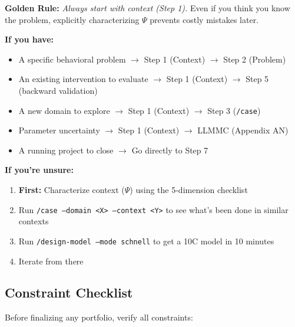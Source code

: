 \begin{tcolorbox}[colback=yellow!5!white,colframe=yellow!75!black,
    title=\textbf{Entry Point Selection: Where Do I Start?}]

\textbf{Golden Rule:} \textit{Always start with context (Step 1).} Even if you think you know the problem, explicitly characterizing $\Psi$ prevents costly mistakes later.

\textbf{If you have:}
\begin{itemize}[noitemsep]
    \item A specific behavioral problem $\to$ Step 1 (Context) $\to$ Step 2 (Problem)
    \item An existing intervention to evaluate $\to$ Step 1 (Context) $\to$ Step 5 (backward validation)
    \item A new domain to explore $\to$ Step 1 (Context) $\to$ Step 3 (\texttt{/case})
    \item Parameter uncertainty $\to$ Step 1 (Context) $\to$ LLMMC (Appendix AN)
    \item A running project to close $\to$ Go directly to Step 7
\end{itemize}

\textbf{If you're unsure:}
\begin{enumerate}[noitemsep]
    \item \textbf{First:} Characterize context ($\Psi$) using the 5-dimension checklist
    \item Run \texttt{/case --domain <X> --context <Y>} to see what's been done in similar contexts
    \item Run \texttt{/design-model --mode schnell} to get a 10C model in 10 minutes
    \item Iterate from there
\end{enumerate}

\end{tcolorbox}

\subsection{Constraint Checklist}
\label{sec:25-constraint-checklist}

Before finalizing any portfolio, verify all constraints:

